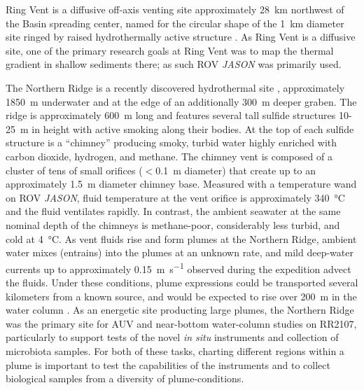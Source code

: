 Ring Vent is a diffusive off-axis venting site approximately \SI{28}{\kilo\meter} northwest of the Basin spreading center, named for the circular shape of the \SI{1}{\kilo\meter} diameter site ringed by raised hydrothermally active structure \autocite{teske2019characteristics}. As Ring Vent is a diffusive site, one of the primary research goals at Ring Vent was to map the thermal gradient in shallow sediments there; as such ROV \emph{JASON} was primarily used.

The Northern Ridge is a recently discovered hydrothermal site \autocite{soule2018exploration, geilert2018formation}, approximately \SI{1850}{\meter} underwater and at the edge of an additionally \SI{300}{\meter} deeper graben. The ridge is approximately \SI{600}{\meter} long and features several tall sulfide structures 10-\SI{25}{\meter} in height with active smoking along their bodies. At the top of each sulfide structure is a ``chimney'' producing smoky, turbid water highly enriched with carbon dioxide, hydrogen, and methane. The chimney vent is composed of a cluster of tens of small orifices ($<$\SI{0.1}{\meter} diameter) that create up to an approximately \SI{1.5}{\meter} diameter chimney base. Measured with a temperature wand on ROV \emph{JASON}, fluid temperature at the vent orifice is approximately \SI{340}{\celsius} and the fluid ventilates rapidly. In contrast, the ambient seawater at the same nominal depth of the chimneys is methane-poor, considerably less turbid, and cold at \SI{4}{\celsius}. As vent fluids rise and form plumes at the Northern Ridge, ambient water mixes (entrains) into the plumes at an unknown rate, and mild deep-water currents up to approximately \SI{0.15}{\meter\per\second} observed during the expedition advect the fluids. Under these conditions, plume expressions could be transported several kilometers from a known source, and would be expected to rise over \SI{200}{\meter} in the water column \autocite{speer1989model}. As an energetic site producting large plumes, the Northern Ridge was the primary site for AUV \Sentry and near-bottom water-column studies on RR2107, particularly to support tests of the novel \emph{in situ} instruments and collection of microbiota samples. For both of these tasks, charting different regions within a plume is important to test the capabilities of the instruments and to collect biological samples from a diversity of plume-conditions.




